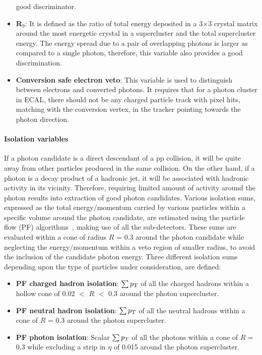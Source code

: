 \begin{itemize}[leftmargin=*]
  good discriminator. 
\item {\bf{R$_{9}$}}: It is defined as the ratio of total energy deposited in a 3$\times$3 crystal matrix around the most energetic crystal in a supercluster and
  the total supercluster energy. The energy spread due to a pair of overlapping photons is larger as compared to a single photon, therefore, this variable
  also provides a good discrimination. 
\item {\bf{Conversion safe electron veto}}: This variable is used to distinguish between electrons and converted photons. It requires that for a photon cluster
  in ECAL, there should not be any charged particle track with pixel hits, matching with the conversion vertex, in the tracker pointing towards the photon direction. 
\end{itemize}
\paragraph{Isolation variables}
\hspace{\parindent} If a photon candidate is a direct descendant of a pp collision, it will be quite away from other particles produced in the same collision.
On the other hand, if a photon is a decay product of a hadronic jet, it will be associated with hadronic activity in its vicinity.
Therefore, requiring limited amount of activity around the photon results into extraction of good photon candidates. Various isolation sums, expressed
as the total energy$/$momentum carried by various particles within a specific volume around the photon candidate, are estimated using the particle flow (PF)
algorithms~\cite{Sirunyan:2017ulk}, making use of all the sub-detectors. These sums are evaluated within a cone of radius $R$ = 0.3 around the photon candidate while
neglecting the energy$/$momentum within a veto region of smaller radius, to avoid the inclusion of the candidate photon energy.
Three different isolation sums depending upon the
type of particles under consideration, are defined:
\begin{itemize}[leftmargin=*]
\item {\bf{PF charged hadron isolation}}: $\sum{\ensuremath{p_{\mathrm T}}}$ of all the charged hadrons within a hollow cone of 0.02 $<$ $R$ $<$ 0.3 around the photon supercluster.
\item {\bf{PF neutral hadron isolation}}: $\sum{\ensuremath{p_{\mathrm T}}}$ of all the neutral hadrons within a cone of $R$ = 0.3 around the photon supercluster. 
\item {\bf{PF photon isolation}}: Scalar $\sum{\ensuremath{p_{\mathrm T}}}$ of all the photons within a cone of $R$ = 0.3 while excluding a strip in $\eta$ of 0.015 around
  the photon supercluster.
\end{itemize}
